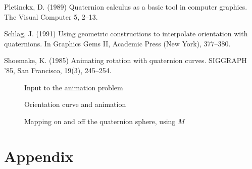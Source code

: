\begin{thebibliography}{Shoemake 85}
Pletinckx, D. (1989) Quaternion calculus as a basic tool in computer graphics.
The Visual Computer 5, 2--13.

Schlag, J. (1991) Using geometric constructions to interpolate
orientation with quaternions.  In Graphics Gems II, Academic Press (New York),
377--380.


Shoemake, K. (1985) Animating rotation with quaternion curves.
SIGGRAPH '85, San Francisco, 19(3), 245--254.

\end{thebibliography}

\clearpage

\begin{figure}
\vspace{2.5in}
\caption{Input to the animation problem}
\label{fig:input}
\end{figure}

\begin{figure*}
\vspace{2in}
\caption{Orientation curve and animation}
\label{fig:output}
\end{figure*}

\begin{figure}
\vspace{2.5in}
\caption{Mapping on and off the quaternion sphere, using $M$}
\label{fig:method}
\end{figure}

\ifFull %
\section{Appendix}

